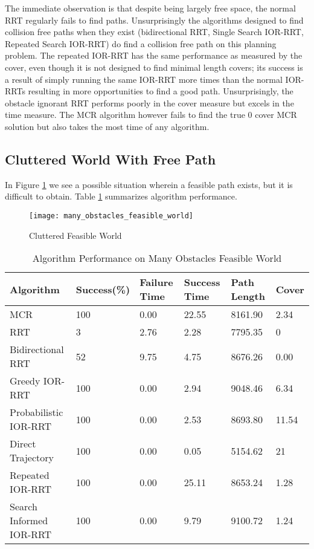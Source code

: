 The immediate observation is that despite being largely free space, the normal RRT regularly fails to find paths. Unsurprisingly the algorithms designed to find collision free paths when they exist (bidirectional RRT, Single Search IOR-RRT, Repeated Search IOR-RRT) do find a collision free path on this planning problem. The repeated IOR-RRT has the same performance as measured by the cover, even though it is not designed to find minimal length covers; its success is a result of simply running the same IOR-RRT more times than the normal IOR-RRTs resulting in more opportunities to find a good path. Unsurprisingly, the obstacle ignorant RRT performs poorly in the cover measure but excels in the time measure. The MCR algorithm however fails to find the true 0 cover MCR solution but also takes the most time of any algorithm.

\subsection{Cluttered World With Free Path}
In Figure \ref{fig:many_obstacles_feasible_world} we see a possible situation wherein a feasible path exists, but it is difficult to obtain. Table \ref{tab:many_obstacles_feasible_world} summarizes algorithm performance.

\begin{figure}[h!]
    \centering
    \texttt{[image: many\_obstacles\_feasible\_world]}
    \caption{Cluttered Feasible World}
    \label{fig:many_obstacles_feasible_world}
\end{figure}


\begin{table}[h!]
\begin{tabular}{@{}llllll@{}}
\toprule
Algorithm & Success(\%)  & Failure Time  & Success Time  & Path Length & Cover\\ 
\midrule
MCR & 100 & 0.00 & 22.55 & 8161.90 & 2.34 \\
RRT & 3 & 2.76 & 2.28 & 7795.35 & 0 \\
Bidirectional RRT & 52 & 9.75 & 4.75 & 8676.26 & 0.00 \\
Greedy IOR-RRT & 100 & 0.00 & 2.94 & 9048.46 & 6.34 \\
Probabilistic IOR-RRT & 100 & 0.00 & 2.53 & 8693.80 & 11.54 \\
Direct Trajectory & 100 & 0.00 & 0.05 & 5154.62 & 21 \\
Repeated IOR-RRT & 100 & 0.00 & 25.11 & 8653.24 & 1.28 \\
Search Informed IOR-RRT & 100 & 0.00 & 9.79 & 9100.72 & 1.24 \\
\bottomrule
\end{tabular}
\caption{Algorithm Performance on Many Obstacles Feasible World}
\label{tab:many_obstacles_feasible_world}
\end{table}


